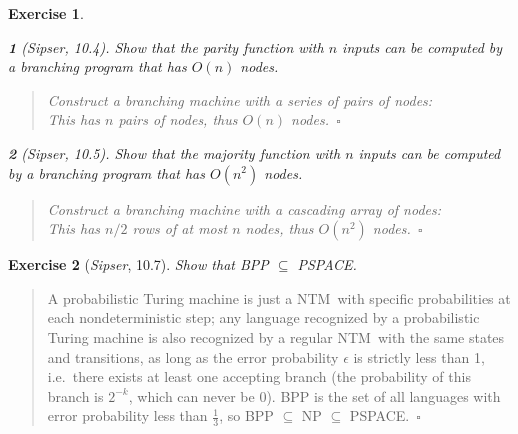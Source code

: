 \documentclass{article}
\theoremstyle{break}			%
\newtheorem{exercise}{Exercise}
\theoremstyle{plain}
\newtheorem{subexercise}{}[exercise]
\newenvironment{answer}{\begin{quotation}\noindent}{\end{quotation}}
\newcommand{\sipser}{\textit{Sipser}}
\newcommand{\qed}{~\ensuremath{\square}}
\newcommand{\NTM}{\textsf{NTM}}
\begin{document}
\begin{exercise}
\begin{subexercise}[\sipser, 10.4]
Show that the parity function with $n$ inputs can be computed by a
branching program that has $O(n)$ nodes.
\end{subexercise}
\begin{answer}
Construct a branching machine with a series of pairs of nodes:
\vspace{2in}\\
This has $n$ pairs of nodes, thus $O(n)$ nodes.\qed
\end{answer}

\begin{subexercise}[\sipser, 10.5]
Show that the majority function with $n$ inputs can be computed by a
branching program that has $O(n^2)$ nodes.
\end{subexercise}
\begin{answer}
Construct a branching machine with a cascading array of nodes:
\vspace{2in}\\
This has $n/2$ rows of at most $n$ nodes, thus $O(n^2)$ nodes.\qed
\end{answer}
\end{exercise}

\begin{exercise}[\sipser, 10.7]
Show that BPP $\subseteq$ PSPACE.
\end{exercise}
\begin{answer}
A probabilistic Turing machine is just a \NTM\ with specific
probabilities at each nondeterministic step; any language recognized
by a probabilistic Turing machine is also recognized by a regular
\NTM\ with the same states and transitions, as long as the error
probability $\epsilon$ is strictly less than 1, i.e.~there exists at
least one accepting branch (the probability of this branch is
$2^{-k}$, which can never be 0).  BPP is the set of all languages with
error probability less than $\frac 13$, so BPP $\subseteq$ NP
$\subseteq$ PSPACE.\qed
\end{answer}
\end{document}
